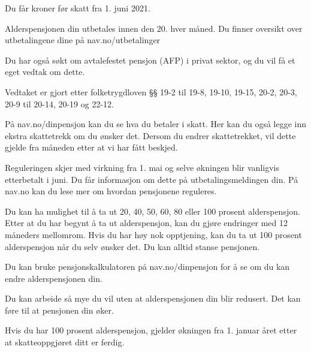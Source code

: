 


    \begin{letter}{\brevparameter}
        Du får \feltalderspensjonmaanedligbeloep kroner før skatt fra 1. juni 2021.

        \par Alderspensjonen din utbetales innen den 20. hver måned. Du finner oversikt over utbetalingene
        dine på nav.no/utbetalinger

        \par Du har også søkt om avtalefestet pensjon (AFP) i privat sektor, og du vil få et eget vedtak om
        dette.

        \par Vedtaket er gjort etter folketrygdloven §§ 19-2 til 19-8, 19-10, 19-15, 20-2, 20-3, 20-9 til 20-14,
        20-19 og 22-12.

        \frasedinerettigheter

        \par På nav.no/dinpensjon kan du se hva du betaler i skatt. Her kan du også legge inn ekstra skattetrekk
        om du ønsker det. Dersom du endrer skattetrekket, vil dette gjelde fra måneden etter at vi har fått
        beskjed.

        Reguleringen skjer med virkning fra 1. mai og selve økningen blir vanligvis etterbetalt i juni. Du
        får informasjon om dette på utbetalingsmeldingen din. På nav.no kan du lese mer om hvordan
        pensjonene reguleres.

        Du kan ha mulighet til å ta ut 20, 40, 50, 60, 80 eller 100 prosent alderspensjon. Etter at du har
        begynt å ta ut alderspensjon, kan du gjøre endringer med 12 måneders mellomrom. Hvis du har
        høy nok opptjening, kan du ta ut 100 prosent alderspensjon når du selv ønsker det. Du kan alltid
        stanse pensjonen.

        \par Du kan bruke pensjonskalkulatoren på nav.no/dinpensjon for å se om du kan endre
        alderspensjonen din.

        Du kan arbeide så mye du vil uten at alderspensjonen din blir redusert. Det kan føre til at
        pensjonen din øker.

        Hvis du har 100 prosent alderspensjon, gjelder økningen fra 1. januar året etter at skatteoppgjøret
        ditt er ferdig.


\end{letter}
